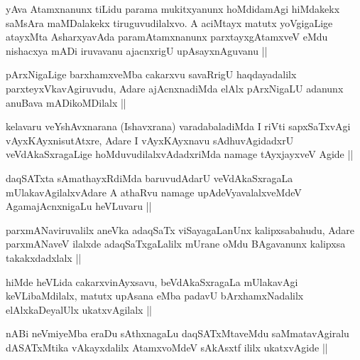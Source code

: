 
\begin{artha}
yAva Atamxnanunx tiLidu parama mukitxyanunx hoMdidamAgi hiMdakekx
saMsAra maMDalakekx tiruguvudilalxvo. A aciMtayx matutx yoVgigaLige
atayxMta AsharxyavAda paramAtamxnanunx parxtayxgAtamxveV eMdu
nishacxya mADi iruvavanu ajacnxrigU upAsayxnAguvanu ||
\end{artha}


\begin{artha}
pArxNigaLige barxhamxveMba cakarxvu savaRrigU haqdayadalilx
parxteyxVkavAgiruvudu, Adare ajAcnxnadiMda elAlx pArxNigaLU adanunx
anuBava mADikoMDilalx ||
\end{artha}

\begin{artha}
kelavaru veYshAvxnarana (Ishavxrana) varadabaladiMda I riVti
sapxSaTxvAgi vAyxKAyxnisutAtxre, Adare I vAyxKAyxnavu sAdhuvAgidadxrU
veVdAkaSxragaLige hoMduvudilalxvAdadxriMda namage tAyxjayxveV Agide ||
\end{artha}


\begin{artha}
daqSATxta sAmathayxRdiMda baruvudAdarU veVdAkaSxragaLa
mUlakavAgilalxvAdare A athaRvu namage upAdeVyavalalxveMdeV
AgamajAcnxnigaLu heVLuvaru ||
\end{artha}

\begin{artha}
parxmANaviruvalilx aneVka adaqSaTx viSayagaLanUnx kalipxsabahudu,
Adare parxmANaveV ilalxde adaqSaTxgaLalilx mUrane oMdu BAgavanunx
kalipxsa takakxdadxlalx ||
\end{artha}


\begin{artha}
hiMde heVLida cakarxvinAyxsavu, beVdAkaSxragaLa mUlakavAgi
keVLibaMdilalx, matutx upAsana eMba padavU bArxhamxNadalilx
elAlxkaDeyalUlx ukatxvAgilalx ||
\end{artha}

\begin{artha}
nABi neVmiyeMba eraDu sAthxnagaLu daqSATxMtaveMdu saMmatavAgiralu
dASATxMtika vAkayxdalilx AtamxvoMdeV sAkAsxtf ililx ukatxvAgide ||
\end{artha}

